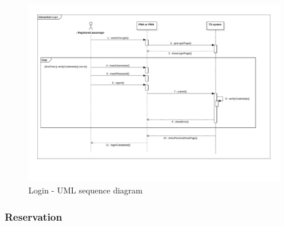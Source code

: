 \begin{landscape}

\begin{figure}[H]
\begin{centering}
\includegraphics[bb=20bp 80bp 830bp 580bp,scale=0.75]{specific-requirements/3.4-use-cases/image/login}
\par\end{centering}

\protect\caption{Login - UML sequence diagram}
\end{figure}


\end{landscape}

\clearpage{}


\subsubsection{Reservation}

